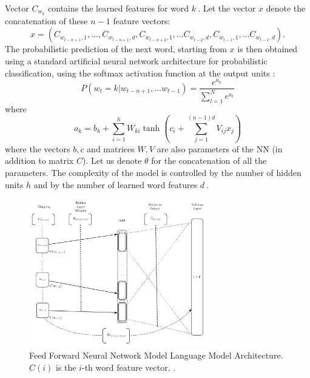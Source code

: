 Vector $C_{w_{k}}$ contains the learned features for word $k\ .$
Let the  vector $x$ denote the concatenation of these $n-1$
feature vectors:
\begin{equation}
  x = (C_{w_{t-n+1},1}, \ldots, C_{w_{t-n+1},d}, C_{w_{t-n+2},1}, \ldots C_{w_{t-2},d}, C_{w_{t-1},1}, \ldots C_{w_{t-1},d}).
\end{equation}
The probabilistic prediction of the next word, starting from $x$
is then obtained using a standard artificial neural network architecture
for probabilistic classification, using the softmax activation function at the output units \cite{Bishop:1995:NNP:525960}:
\begin{equation}
 P(w_t=k | w_{t-n+1}, \ldots w_{t-1}) = \frac{e^{a_k}}{\sum_{l=1}^N e^{a_l}}
\end{equation}
where
\begin{equation}
 a_k = b_k + \sum_{i=1}^h W_{ki} \tanh(c_i + \sum_{j=1}^{(n-1)d} V_{ij} x_j)
\end{equation}
where the vectors $b,c$ and matrices $W,V$ are also
parameters of the \ac{NN}  (in addition to matrix $C$). Let us denote
$\theta$ for the concatenation of all the parameters.
The complexity of the model is controlled by the number of hidden units $h$
and by the number of learned word features $d\ .$ 


\begin{figure}[h]
    \centering
    \includegraphics[width=0.7\textwidth]{images/bengio-nnlm.pdf}
    \caption{Feed Forward Neural Network Model Language Model Architecture.
       $C(i)$ is the $i$-th word feature vector.  \cite{Bengio:2003:NPL:944919.944966}.}
    \label{fig:NNLM_architecture}
\end{figure}

